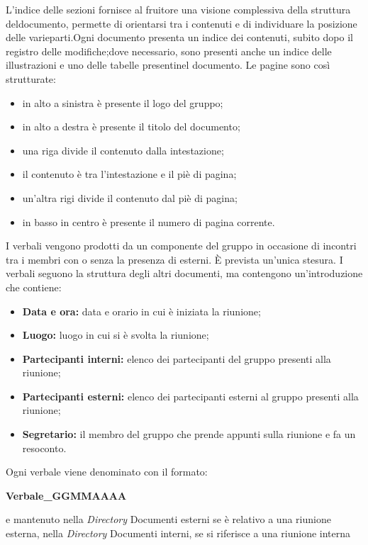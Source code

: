             L’indice delle sezioni fornisce al fruitore una visione complessiva della struttura deldocumento, permette di orientarsi tra i contenuti e di individuare la posizione delle varieparti.Ogni documento presenta un indice dei contenuti, subito dopo il registro delle modifiche;dove necessario, sono presenti anche un indice delle illustrazioni e uno delle tabelle presentinel documento.
            Le pagine sono così strutturate:
            \begin{itemize}
                \item in alto a sinistra è presente il logo del gruppo;
                \item in alto a destra è presente il titolo del documento;
                \item una riga divide il contenuto dalla intestazione;
                \item il contenuto è tra l'intestazione e il piè di pagina;
                \item un'altra rigi divide il contenuto dal piè di pagina;
                \item in basso in centro è presente il numero di pagina corrente.
            \end{itemize}
            I verbali vengono prodotti da un componente del gruppo in occasione di incontri tra i membri con o senza la presenza di esterni. È prevista un'unica stesura. I verbali seguono la struttura degli altri documenti, ma contengono un'introduzione che contiene:
            \begin{itemize}
                \item \textbf{Data e ora:} data e orario in cui è iniziata la riunione;
                \item \textbf{Luogo:} luogo in cui si è svolta la riunione;
                \item \textbf{Partecipanti interni:} elenco dei partecipanti del gruppo presenti alla riunione;
                \item \textbf{Partecipanti esterni:} elenco dei partecipanti esterni al gruppo presenti alla riunione; 
                \item \textbf{Segretario:} il membro del gruppo che prende appunti sulla riunione e fa un resoconto.
            \end{itemize}
            Ogni verbale viene denominato con il formato:
            \begin{center}
                \textbf{Verbale\_GGMMAAAA} \\
            \end{center}
            e mantenuto nella \textit{Directory} Documenti esterni se è relativo a una riunione esterna, nella \textit{Directory} Documenti interni, se si riferisce a una riunione interna

